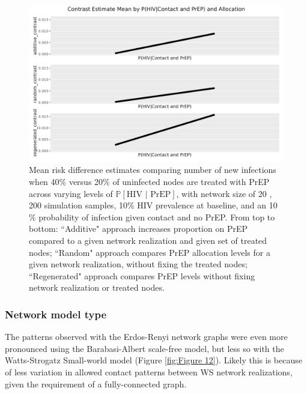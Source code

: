 \documentclass{article}
\theoremstyle{definition}
\begin{document}
\begin{figure}[H]
    \centering
    \includegraphics[width=\linewidth]{Corrected Figures/p2 Mean plots.png}
    \caption{
    Mean risk difference estimates comparing number of new infections when 40\% versus 20\% of uninfected nodes are treated with PrEP across varying levels of  $\mathbb{P}\left[\text{HIV } \vert \text{ PrEP}\right]$, with network size of 20 ,  200 simulation samples,  10\% HIV prevalence at baseline, and an 10 \% probability of infection given contact and no PrEP.
     From top to bottom: ``Additive" approach increases proportion on PrEP compared to a given network realization and given set of treated nodes; ``Random" approach compares PrEP allocation levels for a given network realization, without fixing the treated nodes; ``Regenerated" approach compares PrEP levels without fixing network realization or treated nodes.}
    \label{fig:Figure 11}

\end{figure}

\subsubsection{Network model type}
The patterns observed with the Erdos-Renyi network graphs were even more pronounced using the Barabasi-Albert scale-free model,  but less so with the Watts-Strogatz Small-world model (Figure \ref{fig:Figure 12}). Likely this is because of less variation in allowed contact patterns between WS network realizations, given the requirement of a fully-connected graph. 
\end{document}
